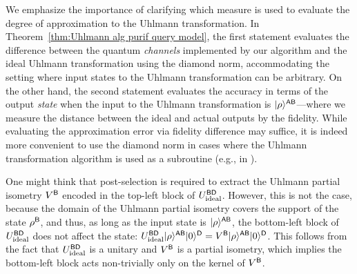 

We emphasize the importance of clarifying which measure is used to evaluate the degree of approximation to the Uhlmann transformation.
In Theorem~\ref{thm:Uhlmann alg purif query model}, the first statement evaluates the difference between the quantum \emph{channels} implemented by our algorithm and the ideal Uhlmann transformation using the diamond norm, accommodating the setting where input states to the Uhlmann transformation can be arbitrary.
On the other hand, the second statement evaluates the accuracy in terms of the output \emph{state} when the input to the Uhlmann transformation is $|\rho\rangle^{{\mathsf{A}}{\mathsf{B}}}$---where we measure the distance between the ideal and actual outputs by the fidelity.
While evaluating the approximation error via fidelity difference may suffice, it is indeed more convenient to use the diamond norm in cases where the Uhlmann transformation algorithm is used as a subroutine (e.g., in ).



One might think that post-selection is required to extract the Uhlmann partial isometry $V^{\mathsf{B}}$ encoded in the top-left block of $U_{\rm ideal}^{{\mathsf{B}}{\mathsf{D}}}$. 
However, this is not the case, because the domain of the Uhlmann partial isometry covers the support of the state $\rho^{\mathsf{B}}$, and thus, as long as the input state is $|\rho\rangle^{{\mathsf{A}}{\mathsf{B}}}$, the bottom-left block of $U_{\rm ideal}^{{\mathsf{B}}{\mathsf{D}}}$ does not affect the state: $U_{\rm ideal}^{{\mathsf{B}}{\mathsf{D}}}|\rho\rangle^{{\mathsf{A}}{\mathsf{B}}}|0\rangle^{\mathsf{D}} = V^{\mathsf{B}}|\rho\rangle^{{\mathsf{A}}{\mathsf{B}}}|0\rangle^{{\mathsf{D}}}$.
This follows from the fact that $U_{\rm ideal}^{{\mathsf{B}}{\mathsf{D}}}$ is a unitary and $V^{\mathsf{B}}$ is a partial isometry, which implies the bottom-left block acts non-trivially only on the kernel of $V^{\mathsf{B}}$.





